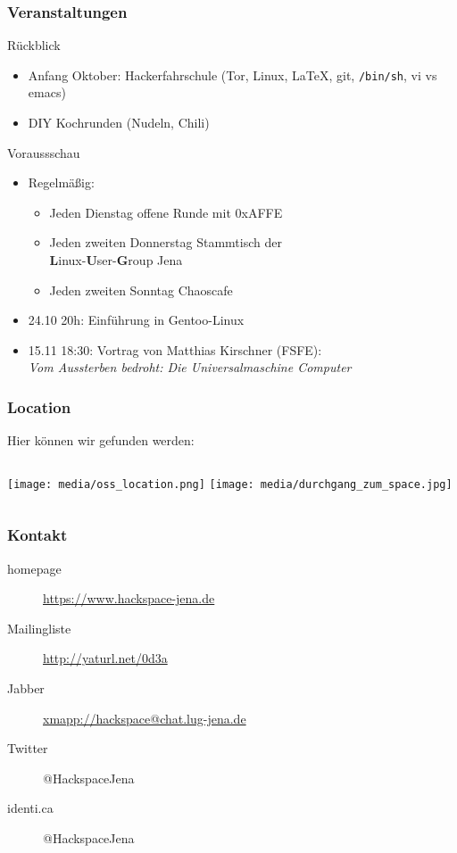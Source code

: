 \documentclass[]{beamer}
\begin{document}
\begin{frame}
	\frametitle{Veranstaltungen}
	\begin{block}{Rückblick}
		\begin{itemize}
			\item Anfang Oktober: Hackerfahrschule 
				(Tor, Linux, \LaTeX{}, git, \texttt{/bin/sh}, vi vs emacs)
			\item DIY Kochrunden (Nudeln, Chili)
		\end{itemize}
	\end{block}
	\begin{block}{Voraussschau}
		\begin{itemize}
			\item Regelmäßig:
				\begin{itemize}
					\item Jeden Dienstag offene Runde mit 0xAFFE
					\item Jeden zweiten Donnerstag Stammtisch der \\
						\textbf{L}inux-\textbf{U}ser-\textbf{G}roup Jena
					\item Jeden zweiten Sonntag Chaoscafe
				\end{itemize}
			\item 24.10 20h: Einführung in Gentoo-Linux
			\item 15.11 18:30: Vortrag von Matthias Kirschner (FSFE):  \\
				\textit{Vom Aussterben bedroht: Die Universalmaschine Computer}
		\end{itemize}	
	\end{block}
\end{frame}
\begin{frame}
	\frametitle{Location}
	Hier können wir gefunden werden: 
	\begin{columns}[c]
		\column[c]{5cm}
			\texttt{[image: media/oss\_location.png]}
		\column[c]{5cm}
			\texttt{[image: media/durchgang\_zum\_space.jpg]}
	\end{columns}
\end{frame}
\begin{frame}
	\frametitle{Kontakt}
	\begin{block}{}
		\begin{description}
			\item[homepage] \url{https://www.hackspace-jena.de}
			\item[Mailingliste] \url{http://yaturl.net/0d3a}
			\item[Jabber] \url{xmapp://hackspace@chat.lug-jena.de}
			\item[Twitter] @HackspaceJena
			\item[identi.ca] @HackspaceJena
		\end{description}
	\end{block}
\end{frame}
\end{document}
